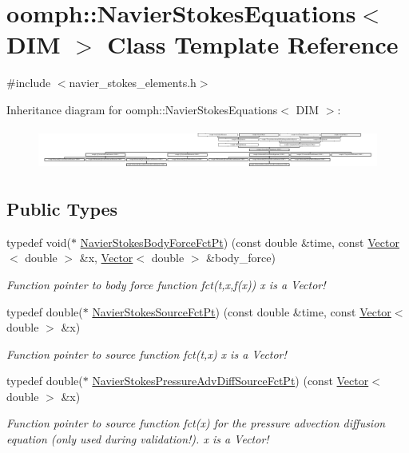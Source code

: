 \hypertarget{classoomph_1_1NavierStokesEquations}{}\section{oomph\+:\+:Navier\+Stokes\+Equations$<$ D\+IM $>$ Class Template Reference}
\label{classoomph_1_1NavierStokesEquations}


{\ttfamily \#include $<$navier\+\_\+stokes\+\_\+elements.\+h$>$}

Inheritance diagram for oomph\+:\+:Navier\+Stokes\+Equations$<$ D\+IM $>$\+:\begin{figure}[H]
\begin{center}
\leavevmode
\includegraphics[height=1.361111cm]{classoomph_1_1NavierStokesEquations}
\end{center}
\end{figure}
\subsection*{Public Types}
\begin{DoxyCompactItemize}
\item 
typedef void($\ast$ \hyperlink{classoomph_1_1NavierStokesEquations_a01443cdc37d9aa9d7644c79212108842}{Navier\+Stokes\+Body\+Force\+Fct\+Pt}) (const double \&time, const \hyperlink{classoomph_1_1Vector}{Vector}$<$ double $>$ \&x, \hyperlink{classoomph_1_1Vector}{Vector}$<$ double $>$ \&body\+\_\+force)
\begin{DoxyCompactList}\small\item\em Function pointer to body force function fct(t,x,f(x)) x is a Vector! \end{DoxyCompactList}\item 
typedef double($\ast$ \hyperlink{classoomph_1_1NavierStokesEquations_a1d69b671e6d4c0e75a02d6fa3dab478f}{Navier\+Stokes\+Source\+Fct\+Pt}) (const double \&time, const \hyperlink{classoomph_1_1Vector}{Vector}$<$ double $>$ \&x)
\begin{DoxyCompactList}\small\item\em Function pointer to source function fct(t,x) x is a Vector! \end{DoxyCompactList}\item 
typedef double($\ast$ \hyperlink{classoomph_1_1NavierStokesEquations_ae97e12328a88431038ccb321ee6d0c73}{Navier\+Stokes\+Pressure\+Adv\+Diff\+Source\+Fct\+Pt}) (const \hyperlink{classoomph_1_1Vector}{Vector}$<$ double $>$ \&x)
\begin{DoxyCompactList}\small\item\em Function pointer to source function fct(x) for the pressure advection diffusion equation (only used during validation!). x is a Vector! \end{DoxyCompactList}\end{DoxyCompactItemize}
